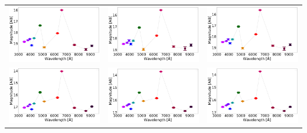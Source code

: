 \begin{table}
\begin{tabular}{ccc}

\includegraphics[width=0.3\linewidth, clip]{photopectrum_splus_MC0114-273678_aper.pdf} & \includegraphics[width=0.3\linewidth, clip]{photopectrum_splus_MC0114-273678_auto.pdf} & \includegraphics[width=0.3\linewidth, clip]{photopectrum_splus_MC0114-273678_petro.pdf} \\
\includegraphics[width=0.3\linewidth, clip]{photopectrum_splus_MC0115-043944_aper.pdf} & \includegraphics[width=0.3\linewidth, clip]{photopectrum_splus_MC0115-043944_auto.pdf} & \includegraphics[width=0.3\linewidth, clip]{photopectrum_splus_MC0115-043944_petro.pdf} \\

\end{tabular}
\end{table}

